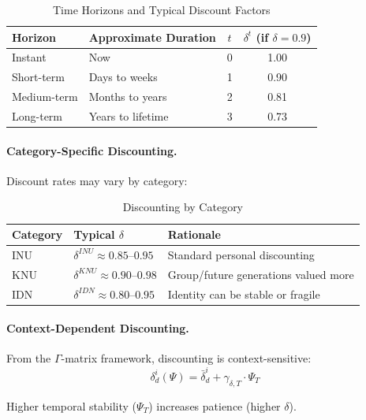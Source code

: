 \begin{table}[htbp]
\centering
\caption{Time Horizons and Typical Discount Factors}
\label{tab:time-discounting}
\renewcommand{\arraystretch}{1.3}
\begin{tabular}{@{}llcc@{}}
\toprule
\textbf{Horizon} & \textbf{Approximate Duration} & \textbf{$t$} & \textbf{$\delta^t$ (if $\delta = 0.9$)} \\
\midrule
Instant & Now & 0 & 1.00 \\
Short-term & Days to weeks & 1 & 0.90 \\
Medium-term & Months to years & 2 & 0.81 \\
Long-term & Years to lifetime & 3 & 0.73 \\
\bottomrule
\end{tabular}
\end{table}

\paragraph{Category-Specific Discounting.}
Discount rates may vary by category:

\begin{table}[htbp]
\centering
\caption{Discounting by Category}
\label{tab:delta-by-category}
\renewcommand{\arraystretch}{1.3}
\begin{tabular}{@{}lll@{}}
\toprule
\textbf{Category} & \textbf{Typical $\delta$} & \textbf{Rationale} \\
\midrule
INU & $\delta^{INU} \approx 0.85$--$0.95$ & Standard personal discounting \\
KNU & $\delta^{KNU} \approx 0.90$--$0.98$ & Group/future generations valued more \\
IDN & $\delta^{IDN} \approx 0.80$--$0.95$ & Identity can be stable or fragile \\
\bottomrule
\end{tabular}
\end{table}

\paragraph{Context-Dependent Discounting.}
From the $\Gamma$-matrix framework, discounting is context-sensitive:
\begin{equation}
\delta^i_d(\Psi) = \bar{\delta}^i_d + \gamma_{\delta,T} \cdot \Psi_T
\end{equation}

Higher temporal stability ($\Psi_T$) increases patience (higher $\delta$).

